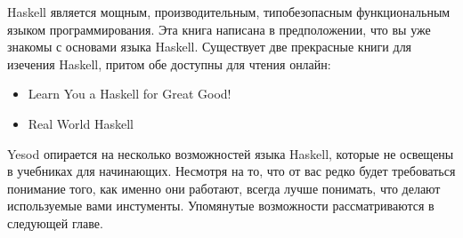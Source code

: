 Haskell является мощным, производительным, типобезопасным функциональным языком программирования. Эта книга написана в предположении, что вы уже знакомы с основами языка Haskell. Существует две прекрасные книги для изечения Haskell, притом обе доступны для чтения онлайн:

\begin{itemize}
  \item Learn You a Haskell for Great Good!
  \item Real World Haskell
\end{itemize}

Yesod опирается на несколько возможностей языка Haskell, которые не освещены в учебниках для начинающих. Несмотря на то, что от вас редко будет требоваться понимание того, как именно они работают, всегда лучше понимать, что делают используемые вами инстументы. Упомянутые возможности рассматриваются в следующей главе.

